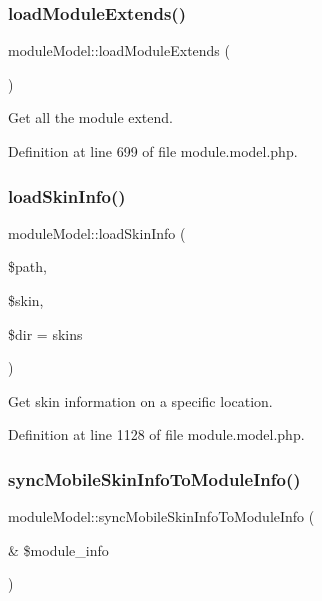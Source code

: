\subsubsection{\texorpdfstring{load\+Module\+Extends()}{loadModuleExtends()}}
{\footnotesize\ttfamily module\+Model\+::load\+Module\+Extends (\begin{DoxyParamCaption}{ }\end{DoxyParamCaption})}



Get all the module extend. 



Definition at line 699 of file module.\+model.\+php.

\hypertarget{classmoduleModel_a2b655921c58fd41c547b78481d585275}{}\label{classmoduleModel_a2b655921c58fd41c547b78481d585275} 
\subsubsection{\texorpdfstring{load\+Skin\+Info()}{loadSkinInfo()}}
{\footnotesize\ttfamily module\+Model\+::load\+Skin\+Info (\begin{DoxyParamCaption}\item[{}]{\$path,  }\item[{}]{\$skin,  }\item[{}]{\$dir = {\ttfamily \textquotesingle{}skins\textquotesingle{}} }\end{DoxyParamCaption})}



Get skin information on a specific location. 



Definition at line 1128 of file module.\+model.\+php.

\hypertarget{classmoduleModel_ae90cd832480cf8c46e96d95c20a63387}{}\label{classmoduleModel_ae90cd832480cf8c46e96d95c20a63387} 
\subsubsection{\texorpdfstring{sync\+Mobile\+Skin\+Info\+To\+Module\+Info()}{syncMobileSkinInfoToModuleInfo()}}
{\footnotesize\ttfamily module\+Model\+::sync\+Mobile\+Skin\+Info\+To\+Module\+Info (\begin{DoxyParamCaption}\item[{\&}]{\$module\+\_\+info }\end{DoxyParamCaption})}

